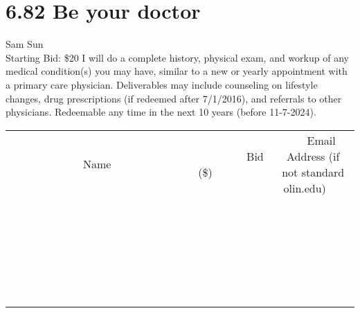 \documentclass[11pt]{article}
\begin{document}
\section*{6.82 Be your doctor}
Sam Sun
\\
Starting Bid: \$20
\newline
I will do a complete history, physical exam, and workup of any medical condition(s) you may have, similar to a new or yearly appointment with a primary care physician.  Deliverables may include counseling on lifestyle changes, drug prescriptions (if redeemed after 7/1/2016), and referrals to other physicians. Redeemable any time in the next 10 years (before 11-7-2024).
\\[6ex]
\begin{tabular}{c c c}
~~~~~~~~~~~~~Name~~~~~~~~~~~~~ & ~~~~~~~~~Bid (\$)~~~~~~~~~  & ~~~Email Address (if not standard olin.edu)~~~\\
 & & \\
\hline
 & & \\
\hline
 & & \\
\hline
 & & \\
\hline
 & & \\
\hline
 & & \\
\hline
 & & \\
\hline
 & & \\
\hline
 & & \\
\hline
 & & \\
\hline
 & & \\
\hline
 & & \\
\hline
 & & \\
\hline
 & & \\
\hline
 & & \\
\hline
 & & \\
\hline
 & & \\
\hline
 & & \\
\hline
 & & \\
\hline
 & & \\
\hline
 & & \\
\hline
 & & \\
\hline
 & & \\
\hline
 & & \\
\hline
 & & \\
\hline
 & & \\
\hline
\end{tabular}
\newpage
\end{document}
